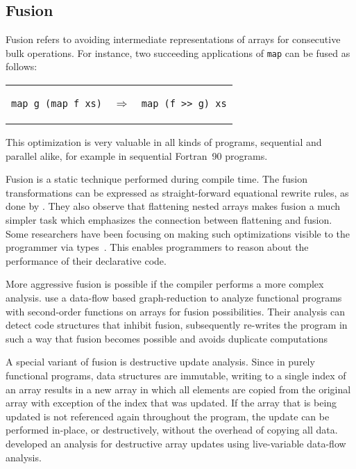 \documentclass[a4paper]{article}
\begin{document}
\subsection{Fusion}
\label{sec:fusion}

Fusion refers to avoiding intermediate representations of arrays for
consecutive bulk operations. For instance, two succeeding applications
of \texttt{map} can be fused as follows:

\begin{center}
  \begin{tabular}{ccc}
\begin{lstlisting}[language=ML]
map g (map f xs)
\end{lstlisting}
    & $\Longrightarrow$ &
\begin{lstlisting}[language=ML]
map (f >> g) xs
\end{lstlisting}
  \end{tabular}
\end{center}

This optimization is very valuable in all kinds of programs,
sequential and parallel alike, for example in sequential
Fortran~90 programs\cite{Hwang:1995:AOS:209936.209949}.

Fusion is a static technique performed during compile time. The fusion
transformations can be expressed as straight-forward equational
rewrite rules, as done by
\citet{Chakravarty:2001:FAF:507635.507661}. They also observe that
flattening nested arrays makes fusion a much simpler task which
emphasizes the connection between flattening and fusion. Some
researchers have been focusing on making such optimizations visible to
the programmer via
types~\cite{Lippmeier:2012:GPA:2364506.2364511}. This enables
programmers to reason about the performance of their declarative code.

More aggressive fusion is possible if the compiler performs a more
complex analysis. \citet{Henriksen:2013:TGA:2502323.2502328} use a
data-flow based graph-reduction to analyze functional programs with
second-order functions on arrays for fusion possibilities. Their
analysis can detect code structures that inhibit fusion, subsequently
re-writes the program in such a way that fusion becomes possible and
avoids duplicate computations

A special variant of fusion is destructive update analysis. Since in
purely functional programs, data structures are immutable, writing to
a single index of an array results in a new array in which all
elements are copied from the original array with exception of the
index that was updated. If the array that is being updated is not
referenced again throughout the program, the update can be performed
in-place, or destructively, without the overhead of copying all
data. \citet{Sastry:1994:PDU:182409.182486} developed an analysis for
destructive array updates using live-variable data-flow analysis.
\end{document}
